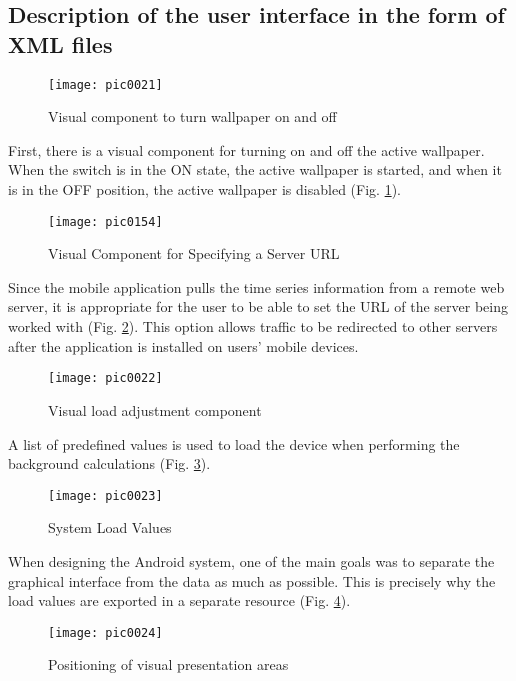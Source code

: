 \subsection{Description of the user interface in the form of XML files}

\begin{figure}[h]
\centering
\texttt{[image: pic0021]}
\caption{Visual component to turn wallpaper on and off}
\label{fig:pic0021}
\end{figure}
\FloatBarrier

First, there is a visual component for turning on and off the active wallpaper. When the switch is in the ON state, the active wallpaper is started, and when it is in the OFF position, the active wallpaper is disabled (Fig. \ref{fig:pic0021}).

\begin{figure}[h]
\centering
\texttt{[image: pic0154]}
\caption{Visual Component for Specifying a Server URL}
\label{fig:pic0154}
\end{figure}
\FloatBarrier

Since the mobile application pulls the time series information from a remote web server, it is appropriate for the user to be able to set the URL of the server being worked with (Fig. \ref{fig:pic0154}). This option allows traffic to be redirected to other servers after the application is installed on users' mobile devices.

\begin{figure}[h]
\centering
\texttt{[image: pic0022]}
\caption{Visual load adjustment component}
\label{fig:pic0022}
\end{figure}
\FloatBarrier

A list of predefined values is used to load the device when performing the background calculations (Fig. \ref{fig:pic0022}).

\begin{figure}[h]
\centering
\texttt{[image: pic0023]}
\caption{System Load Values}
\label{fig:pic0023}
\end{figure}
\FloatBarrier

When designing the Android system, one of the main goals was to separate the graphical interface from the data as much as possible. This is precisely why the load values are exported in a separate resource (Fig. \ref{fig:pic0023}).

\begin{figure}[h]
\centering
\texttt{[image: pic0024]}
\caption{Positioning of visual presentation areas}
\label{fig:pic0024}
\end{figure}
\FloatBarrier

